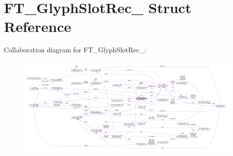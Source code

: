 \hypertarget{structFT__GlyphSlotRec__}{}\section{F\+T\+\_\+\+Glyph\+Slot\+Rec\+\_\+ Struct Reference}
\label{structFT__GlyphSlotRec__}


Collaboration diagram for F\+T\+\_\+\+Glyph\+Slot\+Rec\+\_\+\+:
\nopagebreak
\begin{figure}[H]
\begin{center}
\leavevmode
\includegraphics[width=350pt]{structFT__GlyphSlotRec____coll__graph}
\end{center}
\end{figure}
